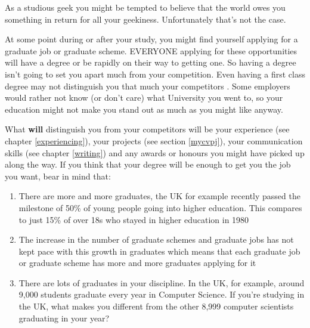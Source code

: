 \documentclass[
]{book}
\providecommand{\tightlist}{%
  \setlength{\itemsep}{0pt}\setlength{\parskip}{0pt}}
\begin{document}
As a studious geek you might be tempted to believe that the world owes you something in return for all your geekiness. Unfortunately that's not the case.

At some point during or after your study, you might find yourself applying for a graduate job or graduate scheme. EVERYONE applying for these opportunities will have a degree or be rapidly on their way to getting one. So having a degree isn't going to set you apart much from your competition. Even having a first class degree may not distinguish you that much your competitors \citep{gradeinflation, firstclass}. Some employers would rather not know (or don't care) what University you went to, so your education might not make you stand out as much as you might like anyway. \citep{bigfour, eyfirm}

What \textbf{will} distinguish you from your competitors will be your experience (see chapter \ref{experiencing}), your projects (see section \ref{mycvpj}), your communication skills (see chapter \ref{writing}) and any awards or honours you might have picked up along the way. If you think that your degree will be enough to get you the job you want, bear in mind that:

\begin{enumerate}
\def\labelenumi{\arabic{enumi}.}
\tightlist
\item
  There are more and more graduates, the UK for example recently passed the milestone of 50\% of young people going into higher education. This compares to just 15\% of over 18s who stayed in higher education in 1980 \citep{lotsofgrads}
\item
  The increase in the number of graduate schemes and graduate jobs has not kept pace with this growth in graduates which means that each graduate job or graduate scheme has more and more graduates applying for it
\item
  There are lots of graduates in your discipline. In the UK, for example, around 9,000 students graduate every year in Computer Science. If you're studying in the UK, what makes you different from the other 8,999 computer scientists graduating in your year?
\end{enumerate}
\end{document}
